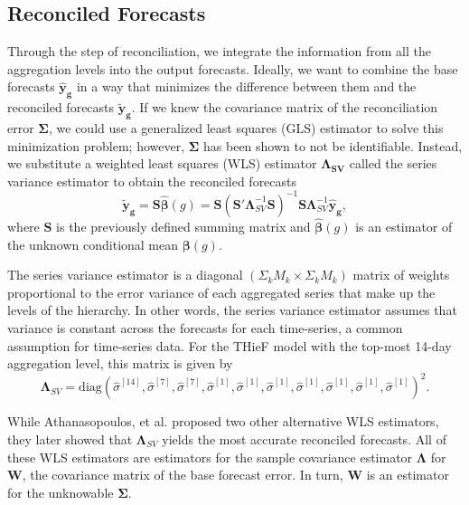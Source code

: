 \documentclass[thesis]{umassthesis}  %
\begin{document}
\subsection{Reconciled Forecasts} \label{thief_reconciled_forecasts}
Through the step of reconciliation, we integrate the information from all the aggregation levels into the output forecasts. Ideally, we want to combine the base forecasts $\boldsymbol{\hat{y}_{g}}$ in a way that minimizes the difference between them and the reconciled forecasts $\boldsymbol{\tilde{y}_{g}}$. If we knew the covariance matrix of the reconciliation error $\boldsymbol{\Sigma}$, we could use a generalized least squares (GLS) estimator to solve this minimization problem; however, $\boldsymbol{\Sigma}$ has been shown to not be identifiable\cite{thief}. Instead, we substitute a weighted least squares (WLS) estimator $\boldsymbol{\Lambda_{SV}}$ called the series variance estimator to obtain the reconciled forecasts \[\boldsymbol{\tilde{y}_g} = \boldsymbol{S \hat{\beta}}(g) = \boldsymbol{S}(\boldsymbol{S'\Lambda}_{SV}^{-1}\boldsymbol{S})^{-1}\boldsymbol{S \Lambda}_{SV}^{-1}\boldsymbol{\hat{y}_g},\] where $\boldsymbol{S}$ is the previously defined summing matrix and $\boldsymbol{\hat{\beta}}(g)$ is an estimator of the unknown conditional mean $\boldsymbol{\beta}(g)$\cite{thief}.

The series variance estimator is a diagonal $(\Sigma_k M_k \times \Sigma_k M_k)$ matrix of weights proportional to the error variance of each aggregated series that make up the levels of the hierarchy. In other words, the series variance estimator assumes that variance is constant across the forecasts for each time-series, a common assumption for time-series data\cite{thief}. For the THieF model with the top-most 14-day aggregation level, this matrix is given by
\[ \boldsymbol{\Lambda}_{SV} = \textrm{diag}(\hat{\sigma}^{[14]}, \hat{\sigma}^{[7]}, \hat{\sigma}^{[7]}, \hat{\sigma}^{[1]}, \hat{\sigma}^{[1]}, \hat{\sigma}^{[1]}, \hat{\sigma}^{[1]}, \hat{\sigma}^{[1]}, \hat{\sigma}^{[1]}, \hat{\sigma}^{[1]})^2. \]

While Athanasopoulos, et al. proposed two other alternative WLS estimators, they later showed that $\boldsymbol{\Lambda}_{SV}$ yields the most accurate reconciled forecasts. All of these WLS estimators are estimators for the sample covariance estimator $\boldsymbol{\Lambda}$ for $\boldsymbol{W}$, the covariance matrix of the base forecast error. In turn, $\boldsymbol{W}$ is an estimator for the unknowable $\boldsymbol{\Sigma}$\cite{thief}.
\end{document}
